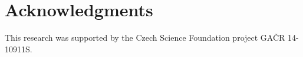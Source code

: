 \documentclass{\adsty/acmsiggraph}
\begin{document}
\section*{Acknowledgments}
\noindent
This research was supported by the Czech Science Foundation  project  GA\v{C}R 14-10911S.



%

%
%







\end{document}
